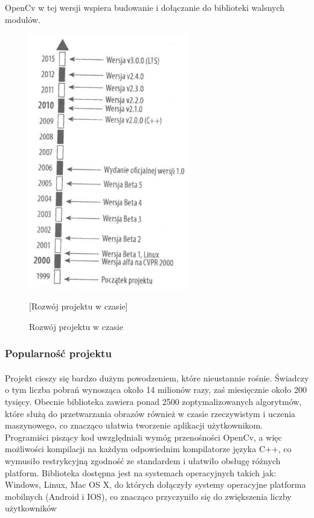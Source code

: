 \documentclass[a4paper,12pt]{article}
\begin{document}
				OpenCv w tej wersji wspiera budowanie i dołączanie do biblioteki walsnych modulów.

	\newpage
				\begin{figure}[!ht]   %
					\begin{center}
						\includegraphics[width=7cm] {osCzasu.png} 
					\end{center}
					\caption
					{Rozwój projektu w czasie}  %
					[Rozwój projektu w czasie]  %
				\end{figure}


		\subsubsection{Popularność projektu}  
			\paragraph{\noindent}
				Projekt cieszy się bardzo dużym powodzeniem, które nieustannie rośnie. Świadczy o tym liczba pobrań 
				wynosząca około 14 milionów razy, zaś miesięcznie około 200 tysięcy.
				Obecnie biblioteka zawiera ponad 2500 zoptymalizowanych algorytmów, które służą do przetwarzania obrazów
				również w czasie rzeczywistym i uczenia maszynowego, co znacząco ułatwia tworzenie aplikacji użytkownikom. 
				Programiści piszący kod uwzględniali wymóg przenośności OpenCv, a więc możliwości kompilacji na każdym odpowiednim kompilatorze języka C++, co wymusiło restrykcyjną zgodność ze standardem i ułatwiło obsługę różnych platform.
				Biblioteka dostępna jest na systemach operacyjnych takich jak: Windows, Linux, Mac OS X, do których dołączyły systemy operacyjne platforma mobilnych (Android i IOS), co znacząco przyczyniło się do zwiększenia liczby użytkowników
\end{document}
